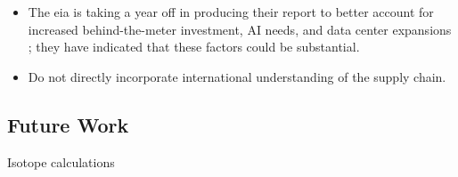 \begin{itemize}
    \item The \gls{eia} is taking a year off in producing their report to better account for increased behind-the-meter investment, AI needs, and data center expansions \cite{eia_annual_outlook_canceled_2023}; they have indicated that these factors could be substantial.
    \item Do not directly incorporate international understanding of the supply chain.
\end{itemize}


\subsection{Future Work}
\label{sec:future_work}

Isotope calculations